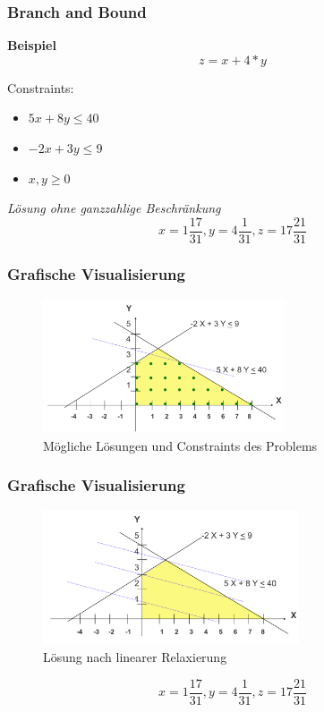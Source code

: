 \documentclass[handout]{beamer}
\begin{document}
  \begin{frame}
    \frametitle{Branch and Bound}
    \textbf{Beispiel}
    $$z = x + 4 * y$$

    Constraints:
    \begin{itemize}
      \item $5x + 8y \leq 40$
      \item $-2x + 3y \leq 9$
      \item $x, y \geq 0$ 
    \end{itemize}

    \pause
    \vspace{1em}

    \textit{Lösung ohne ganzzahlige Beschränkung}
    $$x = 1\frac{17}{31}, y = 4\frac{1}{31}, z = 17\frac{21}{31}$$
  \end{frame}

  \begin{frame}
    \frametitle{Grafische Visualisierung}
    \begin{figure}
      \centering
      \includegraphics[width=\linewidth,height=150px,keepaspectratio]{example_graphical_representation.png}
      \caption{Mögliche Lösungen und Constraints des Problems}
    \end{figure}
  \end{frame}

  \begin{frame}
    \frametitle{Grafische Visualisierung}
    \begin{figure}
      \centering
      \includegraphics[width=\linewidth,height=150px,keepaspectratio]{example_noninteger_solution.png}
      \caption{Lösung nach linearer Relaxierung}
    \end{figure}
    $$x = 1\frac{17}{31}, y = 4\frac{1}{31}, z = 17\frac{21}{31}$$
  \end{frame}
\end{document}
